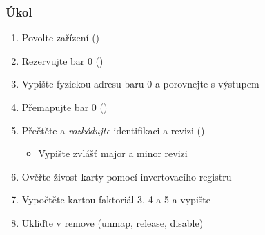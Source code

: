 \begin{frame}
  \frametitle{Úkol}

  \begin{enumerate}
    \item Povolte zařízení ()
    \item Rezervujte bar 0 ()
    \item Vypište fyzickou adresu baru 0 a porovnejte s výstupem 
    \item Přemapujte bar 0 ()

    \item Přečtěte a \emph{rozkódujte} identifikaci a revizi ()
    \begin{itemize}
      \item Vypište zvlášť major a minor revizi
    \end{itemize}

    \item Ověřte živost karty pomocí invertovacího registru

    \iffimuni\else
    \item Vypočtěte kartou faktoriál 3, 4 a 5 a vypište
    \fi

    \item Ukliďte v remove (unmap, release, disable)
  \end{enumerate}

\end{frame}
